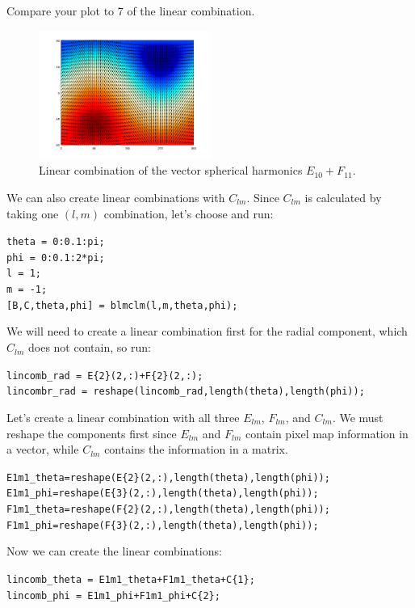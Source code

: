 \documentclass[11pt]{article}
\begin{document}
Compare your plot to 7 of the linear combination.
\begin{figure}[H]
  \centering
  \includegraphics[width=0.5\textwidth]{figures_Rep2/lincombEF_quiver.png}  
  \caption{Linear combination of the vector spherical harmonics $E_{10}+F_{11}$.}
\label{EFcomb_quiver}
\end{figure}

We can also create linear combinations with $C_{lm}$.  Since $C_{lm}$ is calculated by taking one $(l,m)$ combination, let's choose and run:

\verb|theta = 0:0.1:pi;|\\
\verb|phi = 0:0.1:2*pi;|\\
\verb|l = 1;|\\
\verb|m = -1;|\\
\verb|[B,C,theta,phi] = blmclm(l,m,theta,phi);|

We will need to create a linear combination first for the radial component, which $C_{lm}$ does not contain, so run:

\verb|lincomb_rad = E{2}(2,:)+F{2}(2,:);|\\
\verb|lincombr_rad = reshape(lincomb_rad,length(theta),length(phi));|

Let's create a linear combination with all three $E_{lm}$, $F_{lm}$, and $C_{lm}$. 
We must reshape the components first since $E_{lm}$ and $F_{lm}$ contain pixel map information in a vector, while $C_{lm}$ contains the information in a matrix.

\verb|E1m1_theta=reshape(E{2}(2,:),length(theta),length(phi));|\\
\verb|E1m1_phi=reshape(E{3}(2,:),length(theta),length(phi));|\\
\verb|F1m1_theta=reshape(F{2}(2,:),length(theta),length(phi));|\\
\verb|F1m1_phi=reshape(F{3}(2,:),length(theta),length(phi));|

Now we can create the linear combinations:

\verb|lincomb_theta = E1m1_theta+F1m1_theta+C{1};|\\
\verb|lincomb_phi = E1m1_phi+F1m1_phi+C{2};|
\end{document}
